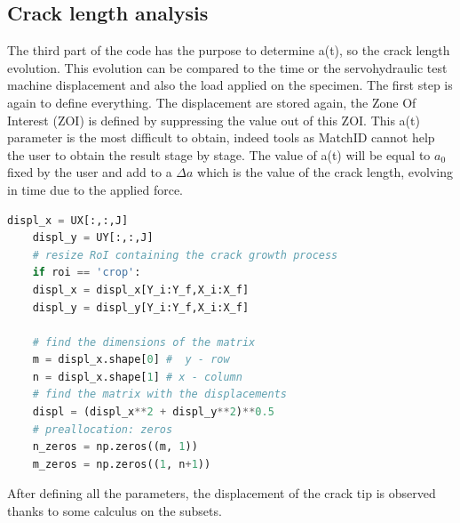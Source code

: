 
\subsection{Crack length analysis}

The third part of the code has the purpose to determine a(t), so the crack length evolution. This evolution can be compared to the time or the servohydraulic test machine displacement and also the load applied on the specimen. The first step is again to define everything. The displacement are stored again, the Zone Of Interest (ZOI) is defined by suppressing the value out of this ZOI.
This a(t) parameter is the most difficult to obtain, indeed tools as MatchID cannot help the user to obtain the result stage by stage. The value of a(t) will be equal to $a_{0}$ fixed by the user and add to a $\Delta a$ which is the value of the crack length, evolving in time due to the applied force.

\begin{lstlisting}[language=Python]
	displ_x = UX[:,:,J]
	displ_y = UY[:,:,J]
	# resize RoI containing the crack growth process
	if roi == 'crop':
	displ_x = displ_x[Y_i:Y_f,X_i:X_f]
	displ_y = displ_y[Y_i:Y_f,X_i:X_f]
	
	# find the dimensions of the matrix
	m = displ_x.shape[0] #  y - row
	n = displ_x.shape[1] # x - column
	# find the matrix with the displacements
	displ = (displ_x**2 + displ_y**2)**0.5
	# preallocation: zeros
	n_zeros = np.zeros((m, 1))
	m_zeros = np.zeros((1, n+1))
\end{lstlisting}

After defining all the parameters, the displacement of the crack tip is observed thanks to some calculus on the subsets. 

